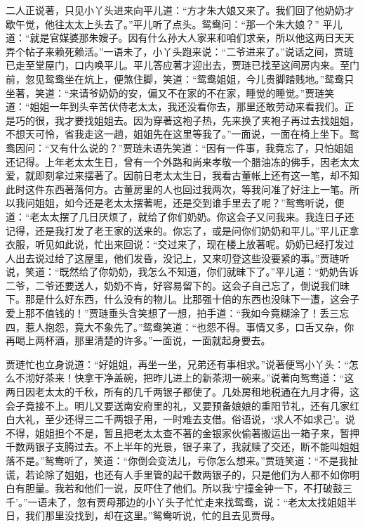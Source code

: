 \begin{parag}
    二人正说著，只见小丫头进来向平儿道：“方才朱大娘又来了。我们回了他奶奶才歇午觉，他往太太上头去了。”平儿听了点头。鸳鸯问：“那一个朱大娘？” 平儿道：“就是官媒婆那朱嫂子。因有什么孙大人家来和咱们求亲，所以他这两日天天弄个帖子来赖死赖活。”一语未了，小丫头跑来说：“二爷进来了。”说话之间，贾琏已走至堂屋门，口内唤平儿。平儿答应著才迎出去，贾琏已找至这间房内来。至门前，忽见鸳鸯坐在炕上，便煞住脚，笑道：“鸳鸯姐姐，今儿贵脚踏贱地。”鸳鸯只坐著，笑道：“来请爷奶奶的安，偏又不在家的不在家，睡觉的睡觉。”贾琏笑道：“姐姐一年到头辛苦伏侍老太太，我还没看你去，那里还敢劳动来看我们。正是巧的很，我才要找姐姐去。因为穿著这袍子热，先来换了夹袍子再过去找姐姐，不想天可怜，省我走这一趟，姐姐先在这里等我了。”一面说，一面在椅上坐下。鸳鸯因问：“又有什么说的？”贾琏未语先笑道：“因有一件事，我竟忘了，只怕姐姐还记得。上年老太太生日，曾有一个外路和尚来孝敬一个腊油冻的佛手，因老太太爱，就即刻拿过来摆著了。因前日老太太生日，我看古董帐上还有这一笔，却不知此时这件东西著落何方。古董房里的人也回过我两次，等我问准了好注上一笔。所以我问姐姐，如今还是老太太摆著呢，还是交到谁手里去了呢？”鸳鸯听说，便道：“老太太摆了几日厌烦了，就给了你们奶奶。你这会子又问我来。我连日子还记得，还是我打发了老王家的送来的。你忘了，或是问你们奶奶和平儿。”平儿正拿衣服，听见如此说，忙出来回说：“交过来了，现在楼上放著呢。奶奶已经打发过人出去说过给了这屋里，他们发昏，没记上，又来叨登这些没要紧的事。”贾琏听说，笑道：“既然给了你奶奶，我怎么不知道，你们就昧下了。”平儿道：“奶奶告诉二爷，二爷还要送人，奶奶不肯，好容易留下的。这会子自己忘了，倒说我们昧下。那是什么好东西，什么没有的物儿。比那强十倍的东西也没昧下一遭，这会子爱上那不值钱的！”贾琏垂头含笑想了一想，拍手道：“我如今竟糊涂了！丢三忘四，惹人抱怨，竟大不象先了。”鸳鸯笑道：“也怨不得。事情又多，口舌又杂，你再喝上两杯酒，那里清楚的许多。”一面说，一面就起身要去。
\end{parag}


\begin{parag}
    贾琏忙也立身说道：“好姐姐，再坐一坐，兄弟还有事相求。”说著便骂小丫头：“怎么不沏好茶来！快拿干净盖碗，把昨儿进上的新茶沏一碗来。”说著向鸳鸯道：“这两日因老太太的千秋，所有的几千两银子都使了。几处房租地税通在九月才得，这会子竟接不上。明儿又要送南安府里的礼，又要预备娘娘的重阳节礼，还有几家红白大礼，至少还得三二千两银子用，一时难去支借。俗语说，‘求人不如求己’。说不得，姐姐担个不是，暂且把老太太查不著的金银家伙偷著搬运出一箱子来，暂押千数两银子支腾过去。不上半年的光景，银子来了，我就赎了交还，断不能叫姐姐落不是。”鸳鸯听了，笑道：“你倒会变法儿，亏你怎么想来。”贾琏笑道：“不是我扯谎，若论除了姐姐，也还有人手里管的起千数两银子的，只是他们为人都不如你明白有胆量。我若和他们一说，反吓住了他们。所以我‘宁撞金钟一下，不打破鼓三千’。”一语未了，忽有贾母那边的小丫头子忙忙走来找鸳鸯，说：“老太太找姐姐半日，我们那里没找到，却在这里。”鸳鸯听说，忙的且去见贾母。
\end{parag}


